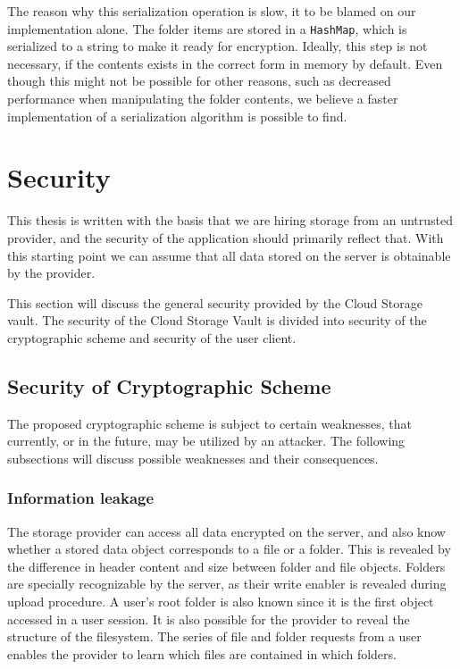 \documentclass[pdftex,english,10pt,b5paper,twoside]{book}
\begin{document}
The reason why this serialization operation is slow, it to be blamed on our
implementation alone. The folder items are stored in a \texttt{HashMap}, which
is serialized to a string to make it ready for encryption. Ideally, this step
is not necessary, if the contents exists in the correct form in memory by
default. Even though this might not be possible for other reasons, such as
decreased performance when manipulating the folder contents, we believe a
faster implementation of a serialization algorithm is possible to find.

\section{Security}
This thesis is written with the basis that we are hiring storage from an
untrusted provider, and the security of the application should primarily
reflect that. With this starting point we can assume that all data stored on
the server is obtainable by the provider.

This section will discuss the general security provided by the Cloud Storage
vault. The security of the Cloud Storage Vault is divided into security of the
cryptographic scheme and security of the user client.

\subsection{Security of Cryptographic Scheme}
The proposed cryptographic scheme is subject to certain weaknesses, that
currently, or in the future, may be utilized by an attacker. The following
subsections will discuss possible weaknesses and their consequences.

\subsubsection{Information leakage}
The storage provider can access all data encrypted on the server, and also know whether a
stored data object corresponds to a file or a folder. This is revealed by the
difference in header content and size between folder and file objects. Folders
are specially recognizable by the server, as their write enabler is revealed
during upload procedure. A user's root folder is also known since it is the
first object accessed in a user session. It is also possible for the provider to
reveal the structure of the filesystem. The series of file and folder requests
from a user enables the provider to learn which files are contained in which folders.
\end{document}
